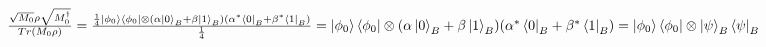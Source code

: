 \documentclass[12pt]{article}
\begin{document}
\begin{enumerate}
          $\frac{\sqrt{M_0}\rho \sqrt{M_0^{\dagger}}}{Tr(M_0\rho)} = \frac{\frac{1}{4}\ket{\phi_0}\bra{\phi_0}\otimes (\alpha\ket{0}_B+\beta\ket{1}_B)(\alpha^*\bra{0}_B+\beta^*\bra{1}_B) }{\frac{1}{4}}
              \\= \ket{\phi_0}\bra{\phi_0}\otimes (\alpha\ket{0}_B+\beta\ket{1}_B)(\alpha^*\bra{0}_B+\beta^*\bra{1}_B)
              \\=\ket{\phi_0}\bra{\phi_0}\otimes \ket{\psi}_B\bra{\psi}_B
          $




\end{enumerate}
\end{document}
